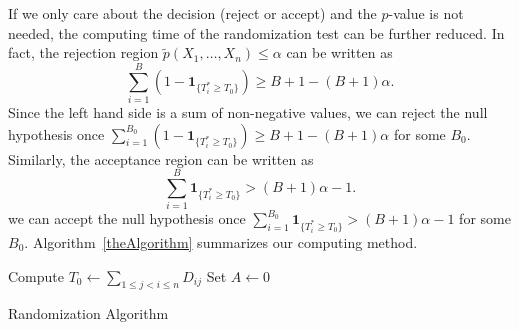 \documentclass[3p]{elsarticle}
\theoremstyle{plain}
\theoremstyle{definition}
\theoremstyle{remark}
\begin{document}
If we only care about the decision (reject or accept) and the $p$-value is not needed, the computing time of the randomization test can be further reduced.
In fact, the rejection region $\tilde{p}(X_1,\ldots, X_n)\leq \alpha$ can be written as
\begin{equation*}
\sum_{i=1}^B (1-\mathbf{1}_{\{T_i^*\geq T_0\}})\geq B +1-(B+1)\alpha.
\end{equation*}
Since the left hand side is a sum of non-negative values, we can reject the null hypothesis once $\sum_{i=1}^{B_0} (1-\mathbf{1}_{\{T_i^*\geq T_0\}})\geq B +1-(B+1)\alpha$ for some $B_0$.
Similarly, the acceptance region can be written as
\begin{equation*}
\sum_{i=1}^B \mathbf{1}_{\{T_i^*\geq T_0\}}> (B+1)\alpha -1.
\end{equation*}
we can accept the null hypothesis once
$\sum_{i=1}^{B_0} \mathbf{1}_{\{T_i^*\geq T_0\}}> (B+1)\alpha -1$ for some $B_0$.
Algorithm~\ref{theAlgorithm} summarizes our computing method.



\begin{algorithm}
    \SetAlgoLined
        Compute $T_0\gets \sum_{1\leq j<i\leq n}D_{ij}$\;
        Set $A\gets 0$\;
        
    \caption{Randomization Algorithm}\label{theAlgorithm}
\end{algorithm}
\end{document}
